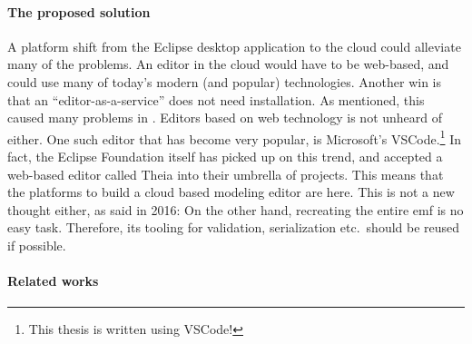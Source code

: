 \paragraph*{The proposed solution}
A platform shift from the \gls{Eclipse} desktop application to the \gls{cloud} could alleviate many of the problems. An editor in the \gls{cloud} would have to be web-based, and could use many of today's modern (and popular) technologies. 
Another win is that an ``editor-as-a-service'' does not need installation.
As mentioned, this caused many problems in \cite{jordicabotFailedConvinceMy2015}. 
Editors based on web technology is not unheard of either. One such editor that has become very popular, is Microsoft's \gls{VSCode}.\footnote{This thesis is written using \gls{VSCode}!}
In fact, the Eclipse Foundation itself has picked up on this trend, and accepted a web-based editor called \gls{Theia} into their umbrella of projects.
This means that the platforms to build a \gls{cloud} based modeling editor are here. 
This is not a new thought either, as \textcite{lajmiModelingBrowserWhat2016} said in 2016: 
On the other hand, recreating the entire \acrlong{emf} is no easy task. Therefore, its tooling for validation, serialization etc.\ should be reused if possible.


\paragraph*{Related works}

